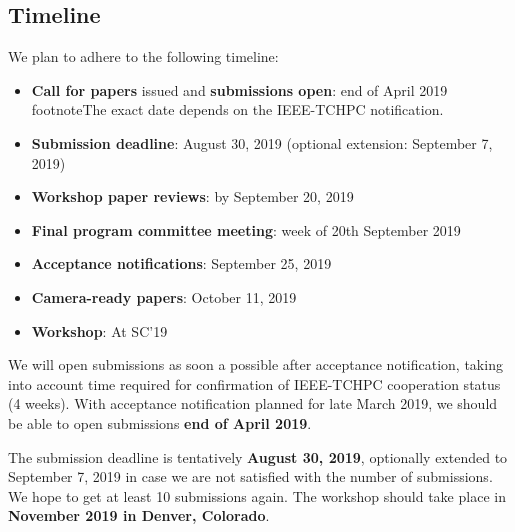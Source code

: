 \documentclass[a4paper,10pt]{article}
\begin{document}
\subsection*{Timeline}
\label{timeline}

We plan to adhere to the following timeline:

\begin{itemize}
    \item \textbf{Call for papers} issued and \textbf{submissions open}: end of April 2019 footnote{The exact date depends on the IEEE-TCHPC notification.}
    \item \textbf{Submission deadline}: August 30, 2019 (optional extension: September 7, 2019)
    \item \textbf{Workshop paper reviews}: by September 20, 2019
    \item \textbf{Final program committee meeting}: week of 20th September 2019
    \item \textbf{Acceptance notifications}: September 25, 2019
    \item \textbf{Camera-ready papers}: October 11, 2019
    \item \textbf{Workshop}: At SC'19
\end{itemize}
\noindent
We will open submissions as soon a possible after acceptance notification, taking into account time required for confirmation of IEEE-TCHPC cooperation status (4 weeks). With acceptance notification planned for late March 2019, we should be able to open submissions \textbf{end of April 2019}.

The submission deadline is tentatively \textbf{August 30, 2019}, optionally extended to September 7, 2019 in case we are not satisfied with the number of submissions. We hope to get at least 10 submissions again.
%
%
%
The workshop should take place in \textbf{November 2019 in Denver, Colorado}.
\end{document}
